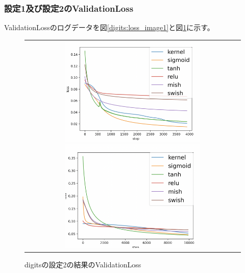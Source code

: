 \subsubsection{設定1及び設定2のValidationLoss}
\label{digits:loss}

ValidationLossのログデータを図\ref{digits:loss_image1}と図\ref{digits:loss_image2}に示す。


\begin{figure}[hbtp]
    \begin{center}
        \begin{tabular}{c}
            \begin{minipage}{0.5\hsize}
                \includegraphics[clip, width=7cm]{asset/digits_0.01_4000_3_002_sgd_non_kaiming_uniform.png}
                    \caption{digitsの設定1の結果のValidationLoss}
                    \label{digits:loss_image1}
            \end{minipage}
            \hspace{10pt}
            \begin{minipage}{0.5\hsize}
                \includegraphics[clip, width=7cm]{asset/digits_0.001_10000_3_002_adam_non_kaiming_uniform.png}
                    \caption{digitsの設定2の結果のValidationLoss}
                    \label{digits:loss_image2}
            \end{minipage}
        \end{tabular}
    \end{center}
\end{figure}


